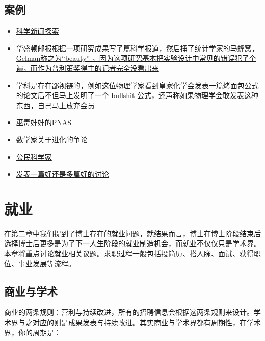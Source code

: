 \documentclass[]{tufte-book}
\begin{document}
\hypertarget{ux6848ux4f8b}{%
\section{案例}\label{ux6848ux4f8b}}

\begin{itemize}
\item
  \href{http://www.statschat.org.nz/2017/02/04/tracing-a-science-story/}{科学新闻探索}
\item
  \href{http://andrewgelman.com/2017/09/19/2010s-never-happened/}{华盛顿邮报根据一项研究成果写了篇科学报道，然后捅了统计学家的马蜂窝，Gelman称之为``beauty'' ，因为这项研究基本把实验设计中常见的错误犯了个遍，而作为普利策奖得主的记者完全没看出来}
\item
  \href{http://wordpress.mrreid.org/2013/08/20/the-equation-for-the-perfect-equation/}{学科是存在鄙视链的，例如这位物理学家看到皇家化学会发表一篇烤面包公式的论文后不但马上发明了一个 bullshit 公式，还声称如果物理学会敢发表这种东西，自己马上放弃会员}
\item
  \href{http://andrewgelman.com/2018/04/01/april-fools-post-dead-serious/}{巫毒娃娃的PNAS}
\item
  \href{https://liorpachter.wordpress.com/2018/09/17/mathematics-matters/}{数学家关于进化的争论}
\item
  \href{http://www.qstheory.cn/science/2018-06/25/c_1123030022.htm}{公民科学家}
\item
  \href{https://deevybee.blogspot.com/2018/07/one-big-study-or-two-small-studies.html}{发表一篇好还是多篇好的讨论}
\end{itemize}

\hypertarget{career}{%
\chapter{就业}\label{career}}

在第二章中我们提到了博士存在的就业问题，就结果而言，博士在博士阶段结束后选择博士后更多是为了下一人生阶段的就业制造机会，而就业不仅仅只是学术界。本章将重点讨论就业相关议题。求职过程一般包括投简历、搭人脉、面试、获得职位、事业发展等流程。

\hypertarget{ux5546ux4e1aux4e0eux5b66ux672f}{%
\section{商业与学术}\label{ux5546ux4e1aux4e0eux5b66ux672f}}

商业的两条规则：营利与持续改进，所有的招聘信息会根据这两条规则来设计。学术界与之对应的则是成果发表与持续改进。其实商业与学术界都有周期性，在学术界，你的周期是：
\end{document}
